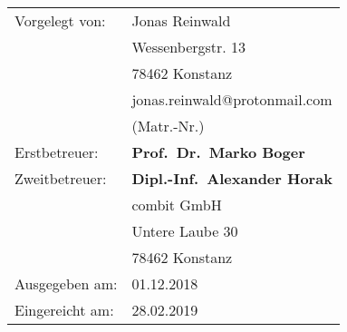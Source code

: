 \begin{titlepage}
    \begingroup
    \renewcommand*{\arraystretch}{1}
    {
        \makeatletter
        \begin{tabular}{>{\raggedright\arraybackslash}p{3.5cm}l}
            Vorgelegt von: & Jonas Reinwald \\
                & Wessenbergstr. 13 \\
                & 78462 Konstanz \\
                & jonas.reinwald@protonmail.com \\
                & \@student@number{} (Matr.-Nr.) \\
            Erstbetreuer: & \textbf{Prof.\ Dr.\ Marko Boger} \\
            Zweitbetreuer: & \textbf{Dipl.-Inf.\ Alexander Horak} \\ 
                & combit GmbH \\
                & Untere Laube 30 \\
                & 78462 Konstanz \\
            Ausgegeben am: & 01.12.2018 \\
            Eingereicht am: & 28.02.2019 \\
        \end{tabular}
        \makeatother
    }
    \endgroup
    
    \bigskip
    
    \end{titlepage}
